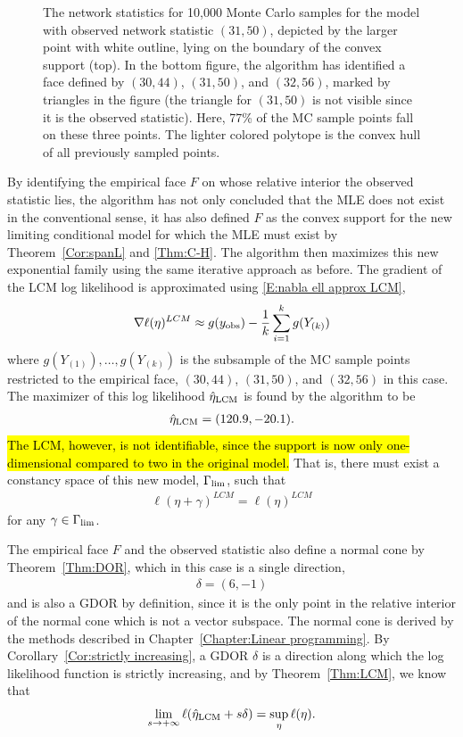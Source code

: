 \begin{figure}[!ht]
\caption{The network statistics for 10,000 Monte Carlo samples for the model with 
observed network statistic $(31,50)$, depicted by the larger point with white 
outline, lying on the boundary of the convex support (top).
In the bottom figure, the algorithm has identified a face defined by $(30,44)$, 
$(31,50)$, and $(32,56)$, marked by triangles in the figure (the triangle for 
$(31,50)$ is not visible since it is the observed statistic).  
Here, 77\% of the MC sample points fall on these three points.  The 
lighter colored polytope is the convex hull of all previously sampled points.
}
\label{F:MC face}
\end{figure}

By identifying the empirical face $F$ on whose relative interior the observed 
statistic lies, 
the algorithm has not only concluded that the MLE does not exist in the conventional 
sense, it has also defined $F$ as the convex support for the new limiting conditional 
model for which the MLE must exist by Theorem~\ref{Cor:spanL} and \ref{Thm:C-H}.
The algorithm then maximizes this new exponential family using the same 
iterative approach as before.  The gradient of the LCM log likelihood is approximated 
using \eqref{E:nabla ell approx LCM},
\begin{align*}
	\nabla \ell( \eta )^{LCM} \approx g(y_{\textrm{obs}}) - \frac{1}{k} \sum_{i=1}^k g(Y_{(k)})
\end{align*}
where $g(Y_{(1)}), \ldots, g(Y_{(k)})$ is the subsample of the MC sample points 
restricted to the empirical face, $(30,44)$, $(31,50)$, and $(32,56)$ in this case.  
The maximizer of this log likelihood $\hat{\eta}_{\textrm{LCM}}$ is found by the algorithm to
be
\begin{align*}
\hat{\eta}_{\textrm{LCM}} = (120.9, -20.1).
\end{align*}
\hl{The LCM, however, is not identifiable, since the support is now only one-dimensional 
compared to two in the original model. } 
That is, there must exist a constancy space of this new model, $\Gamma_{\textrm{lim}}$, such that 
\begin{align} \label{E:Gammalim}
\ell( \eta + \gamma )^{LCM} = \ell( \eta )^{LCM}
\end{align}
for any $\gamma \in \Gamma_{\textrm{lim}}$.

The empirical face $F$ and the observed statistic also define a normal cone by Theorem~\ref{Thm:DOR}, which in this case is a single direction, 
\begin{align*}
	\delta = (6,-1)
\end{align*}
and is also a GDOR by definition, since it is the only point in the relative interior
of the normal cone which is not a vector subspace.  The normal cone is derived by the methods described in Chapter~\ref{Chapter:Linear programming}.
By Corollary~\ref{Cor:strictly increasing}, a GDOR $\delta$ is a direction along which the log likelihood function is strictly increasing, and by 
Theorem~\ref{Thm:LCM}, we know that
\begin{align} \label{E:GDOR lim}
	\lim_{s \to +\infty} \ell( \hat{\eta}_{\textrm{LCM}} + s \delta) = \sup_{\eta} \ell(\eta).
\end{align}


